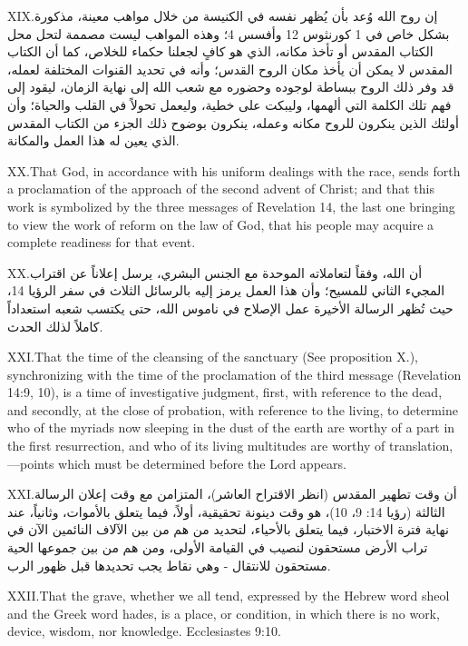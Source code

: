 \lettrine{XIX.} إن روح الله وُعد بأن يُظهر نفسه في الكنيسة من خلال مواهب معينة، مذكورة بشكل خاص في 1 كورنثوس 12 وأفسس 4؛ وهذه المواهب ليست مصممة لتحل محل الكتاب المقدس أو تأخذ مكانه، الذي هو كافٍ لجعلنا حكماء للخلاص، كما أن الكتاب المقدس لا يمكن أن يأخذ مكان الروح القدس؛ وأنه في تحديد القنوات المختلفة لعمله، قد وفر ذلك الروح ببساطة لوجوده وحضوره مع شعب الله إلى نهاية الزمان، ليقود إلى فهم تلك الكلمة التي ألهمها، وليبكت على خطية، وليعمل تحولاً في القلب والحياة؛ وأن أولئك الذين ينكرون للروح مكانه وعمله، ينكرون بوضوح ذلك الجزء من الكتاب المقدس الذي يعين له هذا العمل والمكانة.


\lettrine{XX.} That God, in accordance with his uniform dealings with the race, sends forth a proclamation of the approach of the second advent of Christ; and that this work is symbolized by the three messages of Revelation 14, the last one bringing to view the work of reform on the law of God, that his people may acquire a complete readiness for that event.


\lettrine{XX.} أن الله، وفقاً لتعاملاته الموحدة مع الجنس البشري، يرسل إعلاناً عن اقتراب المجيء الثاني للمسيح؛ وأن هذا العمل يرمز إليه بالرسائل الثلاث في سفر الرؤيا 14، حيث تُظهر الرسالة الأخيرة عمل الإصلاح في ناموس الله، حتى يكتسب شعبه استعداداً كاملاً لذلك الحدث.


\lettrine{XXI.} That the time of the cleansing of the sanctuary (See proposition X.), synchronizing with the time of the proclamation of the third message (Revelation 14:9, 10), is a time of investigative judgment, first, with reference to the dead, and secondly, at the close of probation, with reference to the living, to determine who of the myriads now sleeping in the dust of the earth are worthy of a part in the first resurrection, and who of its living multitudes are worthy of translation,—points which must be determined before the Lord appears.


\lettrine{XXI.} أن وقت تطهير المقدس (انظر الاقتراح العاشر)، المتزامن مع وقت إعلان الرسالة الثالثة (رؤيا 14: 9، 10)، هو وقت دينونة تحقيقية، أولاً، فيما يتعلق بالأموات، وثانياً، عند نهاية فترة الاختبار، فيما يتعلق بالأحياء، لتحديد من هم من بين الآلاف النائمين الآن في تراب الأرض مستحقون لنصيب في القيامة الأولى، ومن هم من بين جموعها الحية مستحقون للانتقال - وهي نقاط يجب تحديدها قبل ظهور الرب.


\lettrine{XXII.} That the grave, whether we all tend, expressed by the Hebrew word sheol and the Greek word hades, is a place, or condition, in which there is no work, device, wisdom, nor knowledge. Ecclesiastes 9:10.


